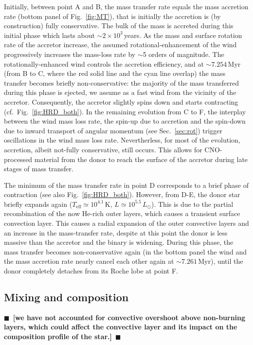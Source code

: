 \documentclass[twocolumn,twocolappendix,trackchanges]{aastex63}
\DeclareRobustCommand{\Figref}[1]{Fig.~\ref{#1}}
\DeclareRobustCommand{\Secref}[1]{Sec.~\ref{#1}}
\newcommand{\todo}[1]{{\large $\blacksquare$~\textbf{\color{red}[#1]}}~$\blacksquare$}
\begin{document}
Initially, between point A and B, the mass transfer rate equals the mass accretion rate
(bottom panel of \Figref{fig:MT}), that is initially the accretion is
(by construction) fully conservative. The bulk of the mass is accreted
during this initial phase which lasts about $\sim{}2\times10^3$\,years. As the mass and surface rotation
rate of the accretor increase, the assumed rotational-enhancement of
the wind progressively increases the mass-loss rate by $\sim$5 orders
of magnitude. The rotationally-enhanced wind
controls the accretion efficiency, and at
$\sim$$7.254$\,Myr (from B to C, where the red solid line and the cyan line overlap) the mass transfer becomes briefly non-conservative: the majority of the mass transferred during this phase is ejected, we assume as a fast wind from the vicinity of the accretor. Consequently, the accretor slightly spins down and starts contracting (cf.~\Figref{fig:HRD_both}).
In the remaining evolution from C to F, the interplay between the wind mass loss rate, the spin-up due to accretion and the spin-down due to inward transport of angular momentum (see \Secref{sec:rot}) trigger oscillations in the wind mass loss rate. Nevertherless, for most of the evolution, accretion, albeit not-fully conservative, still occurs. This allows for CNO-processed material from the donor to reach the surface of the accretor during late stages of mass transfer.

The minimum of the mass transfer rate in point D corresponds to a brief phase of contraction (see also \Figref{fig:HRD_both}). However, from D-E, the donor star briefly expands again
($T_\mathrm{eff}\simeq10^{4.1}$\,K, $L\simeq10^{5.5}\,L_\odot$). This
is due to the partial recombination of the now He-rich outer layers,
which causes a transient surface convection layer. This causes a
radial expansion of the outer convective layers and an increase in the
mass-transfer rate, despite at this point the donor is less massive
than the accretor and the binary is widening.  During this phase, the
mass transfer becomes non-conservative again (in the bottom
panel the wind and the mass accretion rate nearly cancel each other again
at $\sim7.261$\,Myr), until the donor completely detaches from its Roche lobe at point F.

\subsection{Mixing and composition}
\label{sec:mixing}

\todo{we have not accounted for convective overshoot above non-burning layers, which could affect the convective layer and its impact on the composition profile of the star.}
\end{document}
